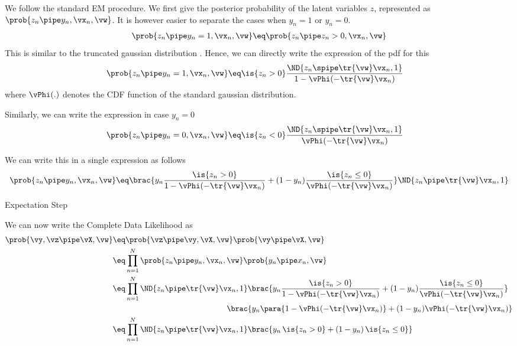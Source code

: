\documentclass{article}
\begin{document}
\begin{question}

	We follow the standard EM procedure.
	We first give the posterior probability of the latent variables $z$, represented as $\prob{z_n \pipe y_n, \vx_n, \vw}$.
	It is however easier to separate the cases when $y_n = 1$ or $y_n = 0$.
	\begin{align*}
		\prob{z_n \pipe y_n = 1, \vx_n, \vw}	&\eq	\prob{z_n \pipe z_n > 0, \vx_n, \vw} \\
	\end{align*}
	This is similar to the truncated gaussian distribution \citep{wiki-trunc-gauss}. Hence, we can directly write the expression of the pdf for this
	\begin{align*}
		\prob{z_n \pipe y_n = 1, \vx_n, \vw}	&\eq	\is{z_n > 0} \frac{\ND{z_n \spipe \tr{\vw} \vx_n, 1}}{1 - \vPhi(-\tr{\vw} \vx_n)}
	\end{align*}
	where $\vPhi(.)$ denotes the CDF function of the standard gaussian distribution.

	Similarly, we can write the expression in case $y_n = 0$
	\begin{align*}
		\prob{z_n \pipe y_n = 0, \vx_n, \vw}	&\eq	\is{z_n < 0} \frac{\ND{z_n \spipe \tr{\vw} \vx_n, 1}}{\vPhi(-\tr{\vw} \vx_n)}
	\end{align*}

	We can write this in a single expression as follows
	\begin{align*}
		\prob{z_n \pipe y_n, \vx_n, \vw}	\eq	\brac{y_n \frac{\is{z_n > 0}}{1 - \vPhi(-\tr{\vw} \vx_n)} + (1 - y_n) \frac{\is{z_n \le 0}}{\vPhi(-\tr{\vw} \vx_n)}} \ND{z_n \pipe \tr{\vw} \vx_n, 1}
	\end{align*}

	\begin{qsubsection}{Expectation Step}

		We can now write the Complete Data Likelihood as
		\begin{align*}
			\prob{\vy, \vz \pipe \vX, \vw}	&\eq	\prob{\vz \pipe \vy, \vX, \vw} \prob{\vy \pipe \vX, \vw} \\
			&\eq	\prod_{n = 1}^N \prob{z_n \pipe y_n, \vx_n, \vw} \prob{y_n \pipe x_n, \vw} \\
			&\eq	\prod_{n = 1}^N \ND{z_n \pipe \tr{\vw} \vx_n, 1} \brac{y_n \frac{\is{z_n > 0}}{1 - \vPhi(-\tr{\vw} \vx_n)} + (1 - y_n) \frac{\is{z_n \le 0}}{\vPhi(-\tr{\vw} \vx_n)}} \\&\hspace{5cm} \brac{y_n \para{1 - \vPhi(-\tr{\vw} \vx_n)} + (1 - y_n) \vPhi(-\tr{\vw} \vx_n)} \\
			&\eq	\prod_{n = 1}^N \ND{z_n \pipe \tr{\vw} \vx_n, 1} \brac{y_n\,\is{z_n > 0} + (1 - y_n)\,\is{z_n \le 0}}
		\end{align*}


\end{qsubsection}
\end{question}
\end{document}
